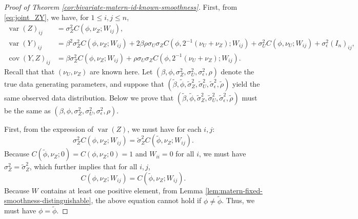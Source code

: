 \documentclass[11pt]{article}
\theoremstyle{definition}
\theoremstyle{remark}
\DeclareMathOperator{\var}{var}
\DeclareMathOperator{\cov}{cov}
\begin{document}
\begin{proof}[Proof of Theorem \ref{cor:bivariate-matern-id-known-smoothness}]
First, from \eqref{eq:joint_ZY}, we have, for $1\le i,j\le n$, 
\begin{align*}\var(Z)_{ij} &= \sigma_Z^2 C(\phi, \nu_Z; W_{ij}),\\
\var(Y)_{ij} &= \beta^2 \sigma_Z^2 C(\phi, \nu_Z; W_{ij}) + 2\beta\rho \sigma_U\sigma_ZC(\phi, 2^{-1}(\nu_U+\nu_Z); W_{ij}) +  \sigma_U^2 C(\phi, \nu_U; W_{ij}) + \sigma_\epsilon^2(I_n)_{ij} , \\
\cov (Y,Z)_{ij} &= \beta \sigma_Z^2 C(\phi, \nu_Z; W_{ij}) + \rho\sigma_U\sigma_Z C(\phi, 2^{-1}(\nu_U+\nu_Z); W_{ij}).\end{align*} 
Recall that that $(\nu_U, \nu_Z)$ are known here. 
Let $(\beta, \phi,\sigma_Z^2, \sigma_U^2, \sigma_\epsilon^2, \rho)$ denote the true data generating parameters, and suppose that $(\tilde\beta, \tilde\phi,\tilde\sigma_Z^2, \tilde\sigma_U^2, \tilde\sigma_\epsilon^2, \tilde\rho)$ yield the same observed data distribution. 
Below we prove that $(\tilde\beta, \tilde\phi,\tilde\sigma_Z^2, \tilde\sigma_U^2, \tilde\sigma_\epsilon^2, \tilde\rho)$ must be the same as $(\beta, \phi,\sigma_Z^2, \sigma_U^2, \sigma_\epsilon^2, \rho)$. 

First, from the expression of $\var(Z)$, we must have for each $i,j$:
\[\sigma_Z^2 C(\phi,\nu_Z;W_{ij}) = \tilde\sigma_Z^2 C(\tilde\phi,\nu_Z;W_{ij}).\]
Because $C(\tilde\phi,\nu_Z; 0) =C(\phi,\nu_Z;0)= 1$ and $W_{ii}=0$ for all $i$, we must have $\sigma_Z^2 = \tilde\sigma_Z^2$, which further implies that for all $i,j$,  
\[ C(\phi,\nu_Z;W_{ij}) = C(\tilde\phi,\nu_Z;W_{ij}).\] 
Because $W$ contains at least one positive element, from Lemma \ref{lem:matern-fixed-smoothness-distinguishable}, 
the above equation cannot hold if $\phi \neq \tilde \phi$. Thus, we must have $\phi = \tilde \phi$. 


\end{proof}
\end{document}
